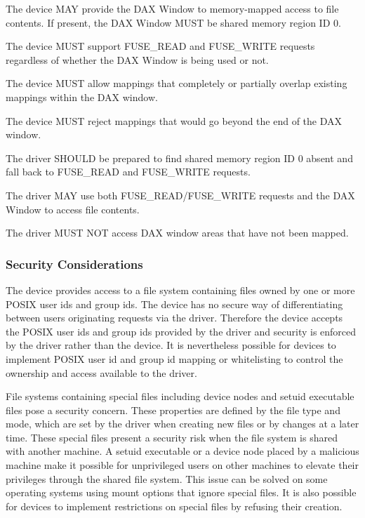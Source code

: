 The device MAY provide the DAX Window to memory-mapped access to file contents.  If present, the DAX Window MUST be shared memory region ID 0.

The device MUST support FUSE\_READ and FUSE\_WRITE requests regardless of whether the DAX Window is being used or not.

The device MUST allow mappings that completely or partially overlap existing mappings within the DAX window.

The device MUST reject mappings that would go beyond the end of the DAX window.


The driver SHOULD be prepared to find shared memory region ID 0 absent and fall back to FUSE\_READ and FUSE\_WRITE requests.

The driver MAY use both FUSE\_READ/FUSE\_WRITE requests and the DAX Window to access file contents.

The driver MUST NOT access DAX window areas that have not been mapped.

\subsubsection{Security Considerations}\label{sec:Device Types / File System Device / Security Considerations}

The device provides access to a file system containing files owned by one or
more POSIX user ids and group ids.  The device has no secure way of
differentiating between users originating requests via the driver.  Therefore
the device accepts the POSIX user ids and group ids provided by the driver and
security is enforced by the driver rather than the device.  It is nevertheless
possible for devices to implement POSIX user id and group id mapping or
whitelisting to control the ownership and access available to the driver.

File systems containing special files including device nodes and setuid
executable files pose a security concern.  These properties are defined by the
file type and mode, which are set by the driver when creating new files or by
changes at a later time.  These special files present a security risk when the
file system is shared with another machine.  A setuid executable or a device
node placed by a malicious machine make it possible for unprivileged users on
other machines to elevate their privileges through the shared file system.
This issue can be solved on some operating systems using mount options that
ignore special files.  It is also possible for devices to implement
restrictions on special files by refusing their creation.


